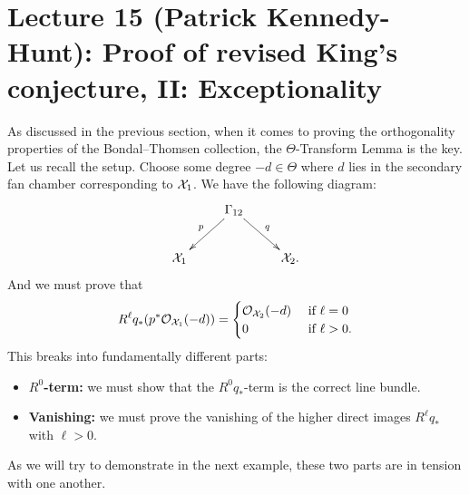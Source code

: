 \documentclass{amsart}
\begin{document}
\section{Lecture 15 (Patrick Kennedy-Hunt): Proof of revised King's conjecture, II: Exceptionality}\label{lec:15-proof-exceptionality}
As discussed in the previous section, when it comes to proving the orthogonality properties of the Bondal--Thomsen collection, the $\Theta$-Transform Lemma is the key.  Let us recall the setup. Choose some degree $-d\in \Theta$ where $d$ lies in the secondary fan chamber corresponding to $\mathcal X_1$.  We have the following diagram:
\[
\xymatrix{
&\Gamma_{12}\ar[ld]_{p}\ar[rd]^{q}&\\
\sX_1&&\sX_2.
}
\]
And we must prove that
\[
R^\ell q_*(p^*{\mathcal O}_{\mathcal X_1}(-d)) =
\begin{cases}
{\mathcal O}_{\mathcal X_2}(-d) & \text{ if $\ell =0$}\\
0 & \text{ if $\ell > 0$}.
\end{cases}
\]
This breaks into fundamentally different parts:
\begin{itemize}
    \item  {\bf $R^0$-term:}  we must show that the $R^0q_*$-term is the correct line bundle.
    \item {\bf Vanishing:}  we must prove the vanishing of the higher direct images $R^\ell q_*$ with $\ell>0$.
\end{itemize}
As we will try to demonstrate in the next example, these two parts are in tension with one another.
\end{document}
